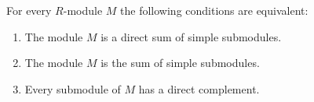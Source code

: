 \begin{proposition}
  \label{proposition: characterisation semisimple modules}
  For every $R$-module $M$ the following conditions are equivalent:
  \begin{enumerate}
    \item
      \label{enumerate: direct sum of simple}
      The module $M$ is a direct sum of simple submodules. 
    \item
      \label{enumerate: sum of simple}
      The module $M$ is the sum of simple submodules.
    \item
      \label{enumerate: direct complements}
      Every submodule of $M$ has a direct complement.
  \end{enumerate}
\end{proposition}




